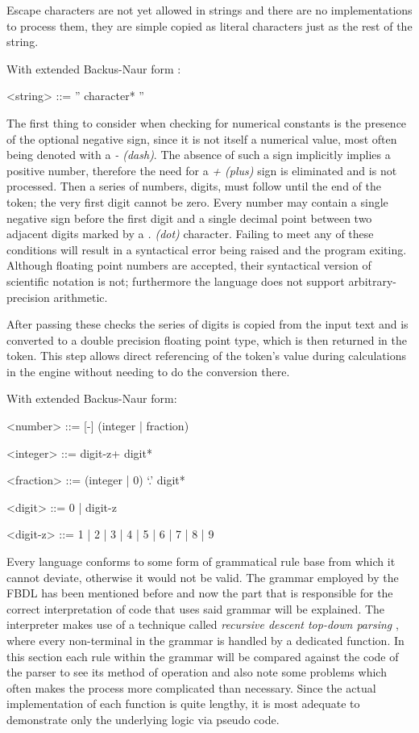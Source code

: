 Escape characters are not yet allowed in strings and there are no implementations to process them, they are simple copied as literal characters just as the rest of the string.

With extended Backus-Naur form :
\begin{grammar}
<string> ::= '' character* ''
\end{grammar}

The first thing to consider when checking for numerical constants is the presence of the optional negative sign, since it is not itself a numerical value, most often being denoted with a \textit{- (dash)}. The absence of such a sign implicitly implies a positive number, therefore the need for a \textit{+ (plus)} sign is eliminated and is not processed. Then a series of numbers, digits, must follow until the end of the token; the very first digit cannot be zero. Every number may contain a single negative sign before the first digit and a single decimal point between two adjacent digits marked by a \textit{. (dot)} character. Failing to meet any of these conditions will result in a syntactical error being raised and the program exiting. Although floating point numbers are accepted, their syntactical version of scientific notation is not; furthermore the language does not support arbitrary-precision arithmetic.

After passing these checks the series of digits is copied from the input text and is converted to a double precision floating point type, which is then returned in the token. This step allows direct referencing of the token's value during calculations in the engine without needing to do the conversion there.

With extended Backus-Naur form:
\begin{grammar}
<number> ::=  [-]  (integer | fraction)

<integer> ::= digit-z+ digit*

<fraction> ::= (integer | 0) `.' digit*

<digit> ::= 0 | digit-z

<digit-z> ::= 1 | 2 | 3 | 4 | 5 | 6 | 7 | 8 | 9

\end{grammar}

Every language conforms to some form of grammatical rule base from which it cannot deviate, otherwise it would not be valid. The grammar employed by the FBDL has been mentioned before and now the part that is responsible for the correct interpretation of code that uses said grammar will be explained. The interpreter makes use of a technique called \textit{recursive descent top-down parsing} \cite{burge1975}\cite{aho1986}, where every non-terminal in the grammar is handled by a dedicated function. In this section each rule within the grammar will be compared against the code of the parser to see its method of operation and also note some problems which often makes the process more complicated than necessary. Since the actual implementation of each function is quite lengthy, it is most adequate to demonstrate only the underlying logic via pseudo code.

